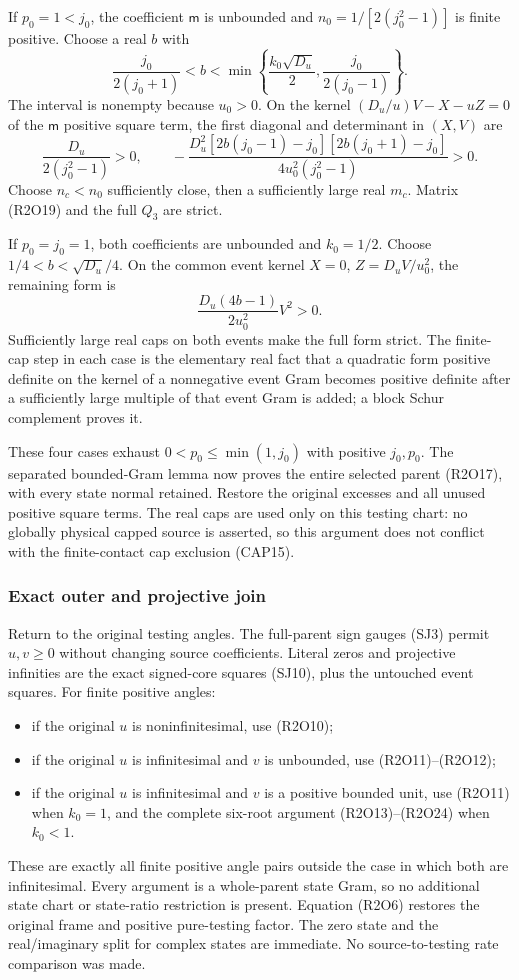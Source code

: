 If $p_0=1<j_0$, the coefficient $\mathsf m$ is unbounded and
$n_0=1/[2(j_0^2-1)]$ is finite positive.  Choose a real $b$ with
\[
\frac{j_0}{2(j_0+1)}<b<
\min\left\{\frac{k_0\sqrt{D_u}}2,
                 \frac{j_0}{2(j_0-1)}\right\}.
\]
The interval is nonempty because $u_0>0$.  On the kernel
$(D_u/u)V-X-uZ=0$ of the $\mathsf m$ positive square term, the first diagonal
and determinant in $(X,V)$ are
\[
\frac{D_u}{2(j_0^2-1)}>0,\qquad
-\frac{D_u^2[2b(j_0-1)-j_0][2b(j_0+1)-j_0]}
       {4u_0^2(j_0^2-1)}>0.
\tag{R2O23}
\]
Choose $n_c<n_0$ sufficiently close, then a sufficiently large real
$m_c$.  Matrix (R2O19) and the full $Q_3$ are strict.

If $p_0=j_0=1$, both coefficients are unbounded and $k_0=1/2$.
Choose $1/4<b<\sqrt{D_u}/4$.  On the common event kernel
$X=0$, $Z=D_uV/u_0^2$, the remaining form is
\[
\frac{D_u(4b-1)}{2u_0^2}V^2>0.
\tag{R2O24}
\]
Sufficiently large real caps on both events make the full form strict.
The finite-cap step in each case is the elementary real fact that a
quadratic form positive definite on the kernel of a nonnegative event
Gram becomes positive definite after a sufficiently large multiple of
that event Gram is added; a block Schur complement proves it.

These four cases exhaust $0<p_0\leq\min(1,j_0)$ with positive $j_0,p_0$.
The separated bounded-Gram lemma now proves the entire selected parent
(R2O17), with every state normal retained.  Restore the original excesses
and all unused positive square terms.  The real caps are used only on this testing
chart: no globally physical capped source is asserted, so this argument
does not conflict with the finite-contact cap exclusion (CAP15).

\subsubsection*{Exact outer and projective join}

Return to the original testing angles.  The full-parent sign gauges
(SJ3) permit $u,v\geq0$ without changing source coefficients.  Literal
zeros and projective infinities are the exact signed-core squares
(SJ10), plus the untouched event squares.  For finite positive angles:
\begin{itemize}
\item if the original $u$ is noninfinitesimal, use (R2O10);
\item if the original $u$ is infinitesimal and $v$ is unbounded,
      use (R2O11)--(R2O12);
\item if the original $u$ is infinitesimal and $v$ is a positive
      bounded unit, use (R2O11) when $k_0=1$, and the complete
      six-root argument (R2O13)--(R2O24) when $k_0<1$.
\end{itemize}
These are exactly all finite positive angle pairs outside the case in
which both are infinitesimal.  Every argument is a whole-parent state
Gram, so no additional state chart or state-ratio restriction is present.
Equation (R2O6) restores the original frame and positive pure-testing
factor.  The zero state and the real/imaginary split for complex states
are immediate.  No source-to-testing rate comparison was made.

